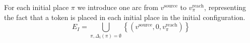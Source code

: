 





For each initial place $\pi$ we introduce one arc from $v^\text{source}$
to $v_\pi^\text{reach}$, representing the fact that a token is placed in each
initial place in the initial configuration.
\[
E_I=\bigcup_{\pi, \Delta_i(\pi) = \emptyset}\left\{ \left(v^\text{source},0,v_\pi^\text{reach}\right)\right\} 
\]

